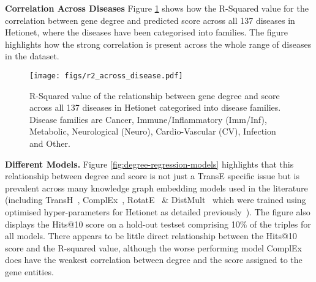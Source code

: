 \textbf{Correlation Across Diseases} Figure \ref{fig:r2-across-disease} shows how the R-Squared value for the correlation between gene degree and predicted score across all 137 diseases in Hetionet, where the diseases have been categorised into families. The figure highlights how the strong correlation is present across the whole range of diseases in the dataset.

\begin{figure}[!th]
	\centering
	\texttt{[image: figs/r2\_across\_disease.pdf]}
	\caption[R-Squared value across disease family]{R-Squared value of the relationship between gene degree and score across all 137 diseases in Hetionet categorised into disease families. Disease families are Cancer, Immune/Inflammatory (Imm/Inf), Metabolic, Neurological (Neuro), Cardio-Vascular (CV), Infection and Other.}
	\label{fig:r2-across-disease}
\end{figure}

\textbf{Different Models.} Figure \ref{fig:degree-regression-models} highlights that this relationship between degree and score is not just a TransE specific issue but is prevalent across many knowledge graph embedding models used in the literature (including TransH~\cite{wang2014knowledge}, ComplEx~\cite{trouillon2016complex}, RotatE~\cite{sun2019rotate} \& DistMult~\cite{yang2015embedding} which were trained using optimised hyper-parameters for Hetionet as detailed previously~\cite{bonner2021understanding}). The figure also displays the Hits@10 score on a hold-out testset comprising 10\% of the triples for all models. There appears to be little direct relationship between the Hits@10 score and the R-squared value, although the worse performing model ComplEx does have the weakest correlation between degree and the score assigned to the gene entities.

